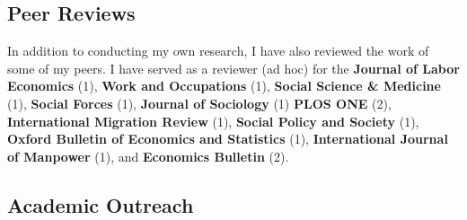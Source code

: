 \documentclass[11pt,a4paper,]{awesome-cv}
\begin{document}
\medskip

\hypertarget{peer-reviews}{%
\subsection{Peer Reviews}\label{peer-reviews}}

\footnotesize

In addition to conducting my own research, I have also reviewed the work
of some of my peers. I have served as a reviewer (ad hoc) for the
\textbf{Journal of Labor Economics} (1), \textbf{Work and Occupations}
(1), \textbf{Social Science \& Medicine} (1), \textbf{Social Forces}
(1), \textbf{Journal of Sociology} (1) \textbf{PLOS ONE} (2),
\textbf{International Migration Review} (1), \textbf{Social Policy and
Society} (1), \textbf{Oxford Bulletin of Economics and Statistics} (1),
\textbf{International Journal of Manpower} (1), and \textbf{Economics
Bulletin} (2). \normalsize

\medskip

\hypertarget{academic-outreach}{%
\subsection{Academic Outreach}\label{academic-outreach}}
\end{document}
